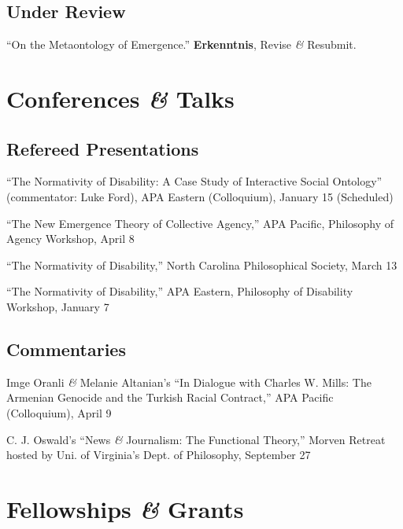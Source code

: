 \documentclass[10pt]{article}
\begin{document}
\subsection*{Under Review}\hangindent=0.8cm ``On the Metaontology of Emergence.'' \textbf{Erkenntnis}, Revise \emph{\&} Resubmit. 

\section*{Conferences \emph{\&} Talks}

\subsection*{Refereed Presentations}

\hangindent=0.8cm ``The Normativity of Disability: A Case Study of Interactive Social Ontology'' (commentator: Luke Ford), APA Eastern (Colloquium), January 15 (Scheduled)\medskip

\hangindent=0.8cm ``The New Emergence Theory of Collective Agency,'' APA Pacific, Philosophy of Agency Workshop, April 8\medskip

\hangindent=0.8cm ``The Normativity of Disability,'' North Carolina Philosophical Society, March 13\medskip

\hangindent=0.8cm ``The Normativity of Disability,'' APA Eastern, Philosophy of Disability Workshop, January 7

\subsection*{Commentaries}

\hangindent=0.8cm Imge Oranli \emph{\&} Melanie Altanian’s ``In Dialogue with Charles W. Mills: The Armenian Genocide and the Turkish Racial Contract,'' APA Pacific (Colloquium), April 9\medskip

\hangindent=0.8cm C. J. Oswald’s ``News \emph{\&} Journalism: The Functional Theory,'' Morven Retreat hosted by Uni. of Virginia’s Dept. of Philosophy, September 27


\section*{Fellowships \emph{\&} Grants}
\end{document}
